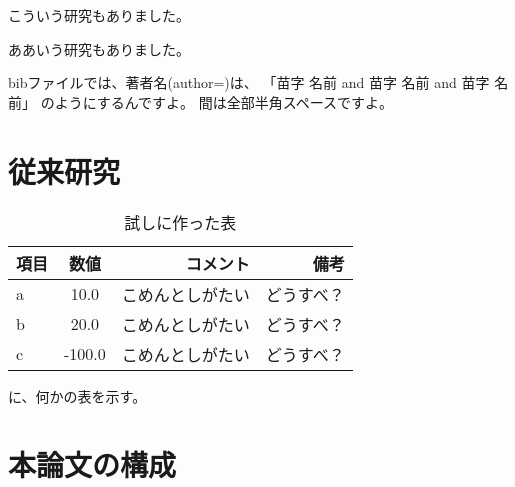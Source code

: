         こういう研究\cite{Ikuo:doctor}もありました。

        ああいう研究\cite{Hondo:JRSJ2011}もありました。

        bibファイルでは、著者名(author=)は、
        「苗字 名前 and 苗字 名前 and 苗字 名前」
        のようにするんですよ\cite{Mizuuchi:RSJ2015-baneoid}。
        間は全部半角スペースですよ。

        \section{従来研究}

        \begin{table}[tb]
          \begin{center}
            \caption{試しに作った表}
            \begin{tabular}{l|c|r|r}
              \hline
              項目 & 数値 & コメント & 備考 \\
              \hline
              a & 10.0 & こめんとしがたい & どうすべ？\\
              b & 20.0 & こめんとしがたい & どうすべ？\\
              c & -100.0 & こめんとしがたい & どうすべ？\\
              \hline
            \end{tabular}
          \end{center}
        \end{table}

        に、何かの表を示す。

        \section{本論文の構成}
